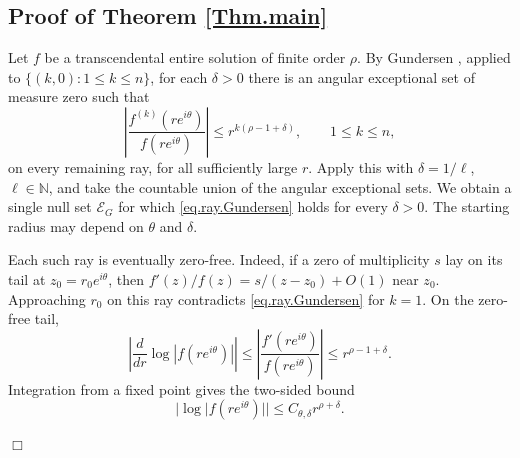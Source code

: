 \documentclass[a4paper,12pt]{article}
\newcommand{\N}{\mathbb{N}}
\newenvironment{proof}
{\noindent{\it Proof.}}{\hfill $\Box$\par\vspace{2.5mm}}
\numberwithin{equation}{section}
\begin{document}
\subsection{Proof of Theorem \ref{Thm.main}}
\begin{proof}
Let $f$ be a transcendental entire solution of finite order $\rho$.
By Gundersen \cite[Corollary 1, p.~89]{Gundersen.deriv.}, applied to
$\{(k,0):1\le k\le n\}$, for each $\delta>0$ there is an angular
exceptional set of measure zero such that
\begin{equation}\label{eq.ray.Gundersen}
 \left|\frac{f^{(k)}(re^{i\theta})}{f(re^{i\theta})}\right|
 \le r^{k(\rho-1+\delta)},\qquad 1\le k\le n,
\end{equation}
on every remaining ray, for all sufficiently large $r$.
Apply this with $\delta=1/\ell$, $\ell\in\N$, and take the countable
union of the angular exceptional sets. We obtain a single null set
$\mathcal E_G$ for which \eqref{eq.ray.Gundersen} holds for every
$\delta>0$. The starting radius may depend on $\theta$ and $\delta$.

Each such ray is eventually zero-free. Indeed, if a zero of multiplicity
$s$ lay on its tail at $z_0=r_0e^{i\theta}$, then
$f'(z)/f(z)=s/(z-z_0)+O(1)$ near $z_0$.
Approaching $r_0$ on this ray contradicts \eqref{eq.ray.Gundersen} for $k=1$.
On the zero-free tail,
\[
 \left|\frac d{dr}\log|f(re^{i\theta})|\right|
 \le \left|\frac{f'(re^{i\theta})}{f(re^{i\theta})}\right|
 \le r^{\rho-1+\delta}.
\]
Integration from a fixed point gives the two-sided bound
\begin{equation}\label{eq.ray.two.sided}
 |\log|f(re^{i\theta})||\le C_{\theta,\delta}r^{\rho+\delta}.
\end{equation}


\end{proof}
\end{document}
